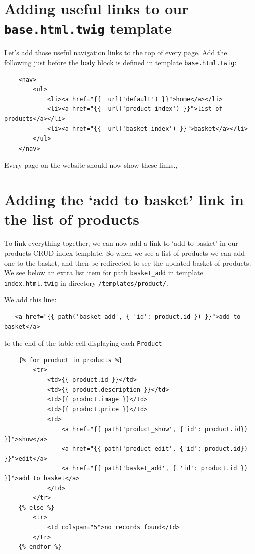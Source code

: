 \documentclass[a4paperpaper,openright]{book}
\begin{document}
\hypertarget{adding-useful-links-to-our-base.html.twig-template}{%
\section{\texorpdfstring{Adding useful links to our
\texttt{base.html.twig}
template}{Adding useful links to our base.html.twig template}}\label{adding-useful-links-to-our-base.html.twig-template}}

Let's add those useful navigation links to the top of every page. Add
the following just before the \texttt{body} block is defined in template
\texttt{base.html.twig}:

\begin{verbatim}
    <nav>
        <ul>
            <li><a href="{{  url('default') }}">home</a></li>
            <li><a href="{{  url('product_index') }}">list of products</a></li>
            <li><a href="{{  url('basket_index') }}">basket</a></li>
        </ul>
    </nav>
\end{verbatim}

Every page on the website should now show these links.,

\hypertarget{adding-the-add-to-basket-link-in-the-list-of-products}{%
\section{Adding the `add to basket' link in the list of
products}\label{adding-the-add-to-basket-link-in-the-list-of-products}}

To link everything together, we can now add a link to `add to basket' in
our products CRUD index template. So when we see a list of products we
can add one to the basket, and then be redirected to see the updated
basket of products. We see below an extra list item for path
\texttt{basket\_add} in template \texttt{index.html.twig} in directory
\texttt{/templates/product/}.

We add this line:

\begin{verbatim}
   <a href="{{ path('basket_add', { 'id': product.id }) }}">add to basket</a>
\end{verbatim}

to the end of the table cell displaying each \texttt{Product}

\begin{verbatim}
    {% for product in products %}
        <tr>
            <td>{{ product.id }}</td>
            <td>{{ product.description }}</td>
            <td>{{ product.image }}</td>
            <td>{{ product.price }}</td>
            <td>
                <a href="{{ path('product_show', {'id': product.id}) }}">show</a>
                <a href="{{ path('product_edit', {'id': product.id}) }}">edit</a>
                <a href="{{ path('basket_add', { 'id': product.id }) }}">add to basket</a>
            </td>
        </tr>
    {% else %}
        <tr>
            <td colspan="5">no records found</td>
        </tr>
    {% endfor %}
\end{verbatim}
\end{document}
